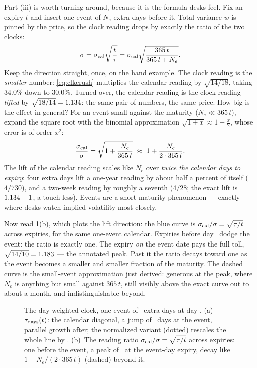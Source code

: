 Part (iii) is worth turning around, because it is the formula desks
feel.  Fix an expiry $t$ and insert one event of $N_e$ extra days
before it.  Total variance $w$ is pinned by the price, so the clock
reading drops by exactly the ratio of the two clocks:
\begin{equation}
\sigma
=\sigma_{\rm cal}\sqrt{\frac{t}{\tau}}
=\sigma_{\rm cal}\sqrt{\frac{365\,t}{365\,t+N_e}} .
\label{eq:clkcrush}
\end{equation}
Keep the direction straight, once, on the hand example.  The clock
reading is the \emph{smaller} number: \eqref{eq:clkcrush} multiplies
the calendar reading by $\sqrt{14/18}$, taking $34.0\%$ down to
$30.0\%$.  Turned over, the calendar reading is the clock reading
\emph{lifted} by
$\sqrt{18/14}=1.134$: the same pair of numbers,
the same price.  How big is the effect in general?  For an event small
against the maturity ($N_e\ll365\,t$), expand the square root with
the binomial approximation $\sqrt{1+x}\approx1+\tfrac{x}{2}$, whose
error is of order $x^2$:
\[
\frac{\sigma_{\rm cal}}{\sigma}
=\sqrt{1+\frac{N_e}{365\,t}}
\;\approx\;1+\frac{N_e}{2\cdot365\,t}.
\]
The lift of the calendar reading scales like $N_e$ over \emph{twice
the calendar days to expiry}: four extra days lift a one-year reading
by about half a percent of itself ($4/730$), and a two-week reading
by roughly a seventh ($4/28$; the exact lift is
$1.134-1$, a touch less).  Events are a
short-maturity phenomenon --- exactly where desks watch implied
volatility most closely.

Now read \cref{fig:clkclock}(b), which plots the lift direction: the
blue curve is $\sigma_{\rm cal}/\sigma=\sqrt{\tau/t}$ across
expiries, for the same one-event calendar.  Expiries before day
\MacClkClockEventDay\ dodge the event: the ratio is exactly one.  The
expiry \emph{on} the event date pays the full toll,
$\sqrt{14/10}=1.183$ --- the annotated peak.  Past it
the ratio decays toward one as the event becomes a smaller and
smaller fraction of the maturity.  The dashed curve is the
small-event approximation just derived: generous at the peak, where
$N_e$ is anything but small against $365\,t$, still visibly above
the exact curve out to about a month, and indistinguishable beyond.

\begin{figure}[htbp]
\centering
{}
\caption{The day-weighted clock, one event of
\MacClkClockExtraDays\ extra days at day \MacClkClockEventDay.
(a)~$\tau_{\rm days}(t)$: the calendar diagonal, a jump of
\MacClkClockExtraDays\ days at the event, parallel growth after; the
normalized variant (dotted) rescales the whole line by
\MacClkClockNormFactor.  (b)~The reading ratio
$\sigma_{\rm cal}/\sigma=\sqrt{\tau/t}$ across expiries: one before
the event, a peak of \MacClkClockPeakRatio\ at the event-day expiry,
decay like $1+N_e/(2\cdot365\,t)$ (dashed) beyond it.}
\label{fig:clkclock}
\end{figure}

